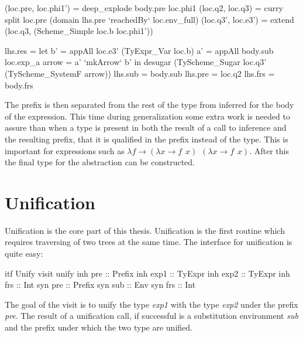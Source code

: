 \begin{code}
(loc.pre, loc.phi1') = deep_explode body.pre loc.phi1
(loc.q2,  loc.q3)  = curry split loc.pre (domain lhs.pre `reachedBy` loc.env_full)
(loc.q3', loc.e3') = extend (loc.q3, (Scheme_Simple loc.b loc.phi1'))
    
lhs.res = let b'    = appAll loc.e3' (TyExpr_Var loc.b)
              a'    = appAll body.sub loc.exp_a
              arrow = a' `mkArrow` b'
          in desugar (TyScheme_Sugar loc.q3' (TyScheme_SystemF arrow))
lhs.sub = body.sub
lhs.pre = loc.q2
lhs.frs = body.frs
\end{code}
The prefix is then separated from the rest of the type from inferred for the body of the expression. This time during generalization some extra work is needed to assure than when a type is present in both the result of a call to inference and the resulting prefix, that it is qualified in the prefix instead of the type. This is important for expressions such as $\lambda f \rightarrow (\lambda x \rightarrow f \hspace{5pt} x) \hspace{5pt} (\lambda x \rightarrow f \hspace{5pt} x)$. After this the final type for the abstraction can be constructed.

\section{Unification}
Unification is the core part of this thesis. Unification is the first routine which requires traversing of two trees at the same time. The interface for unification is quite easy:

\begin{code}
itf Unify
  visit unify
    inh pre  :: Prefix
    inh exp1 :: TyExpr
    inh exp2 :: TyExpr
    inh frs  :: Int
    syn pre  :: Prefix
    syn sub  :: Env
    syn frs  :: Int
\end{code}

The goal of the visit is to unify the type \emph{exp1} with the type \emph{exp2} under the prefix \emph{pre}. The result of a unification call, if successful is a substitution environment \emph{sub} and the prefix under which the two type are unified.

